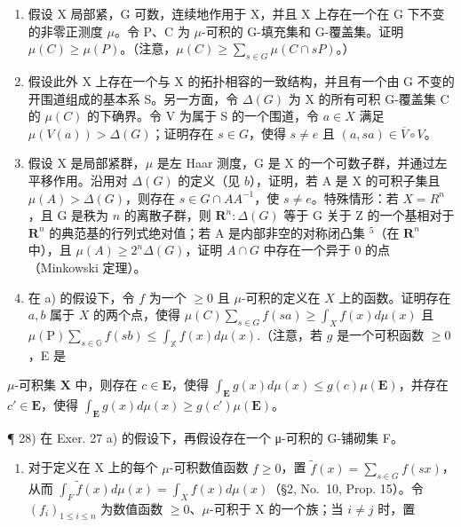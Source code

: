 \begin{enumerate}
\def\labelenumi{\alph{enumi})}
\item
  假设 X 局部紧，G 可数，连续地作用于 X，并且 X 上存在一个在 G 下不变的非零正测度 \(\mu\)。令 P、C 为 \(\mu\)-可积的 G-填充集和 G-覆盖集。证明 \(\mu(C) \geqslant \mu(P)\)。（注意，\(\mu(C) \geqslant \sum_{s \in G} \mu(C \cap sP)\)。）
\item
  假设此外 X 上存在一个与 X 的拓扑相容的一致结构，并且有一个由 G 不变的开围道组成的基本系 S。另一方面，令 \(\Delta(G)\) 为 X 的所有可积 G-覆盖集 C 的 \(\mu(C)\) 的下确界。令 V 为属于 S 的一个围道，令 \(a \in X\) 满足 \(\mu(V(a)) > \Delta(G)\)；证明存在 \(s \in G\)，使得 \(s \neq e\) 且 \((a, sa) \in \overline{V} \circ V\)。
\item
  假设 X 是局部紧群，\(\mu\) 是左 Haar 测度，G 是 X 的一个可数子群，并通过左平移作用。沿用对 \(\Delta(G)\) 的定义（见 \(b\)），证明，若 A 是 X 的可积子集且 \(\mu(A) > \Delta(G)\)，则存在 \(s \in G \cap AA^{-1}\)，使 \(s \neq e\)。特殊情形：若 \(X = R^n\)，且 G 是秩为 \(n\) 的离散子群，则 \(\mathbf{R}^n: \Delta(G)\) 等于 G 关于 Z 的一个基相对于 \(\mathbf{R}^n\) 的典范基的行列式绝对值；若 A 是内部非空的对称闭凸集 \(^5\)（在 \(\mathbf{R}^n\) 中），且 \(\mu(A) \geqslant 2^n \Delta(G)\)，证明 \(A \cap G\) 中存在一个异于 0 的点（Minkowski 定理）。
\item
在 a) 的假设下，令 \(f\) 为一个 \(\geqslant 0\) 且 \(\mu\)-可积的定义在 \(X\) 上的函数。证明存在 \(a, b\) 属于 \(X\) 的两个点，使得 \(\mu(C) \sum_{s \in G} f(sa) \geqslant \int_X f(x) d\mu(x)\) 且 \(\mu (\mathrm{P})\sum_{s\in \mathbb{G}}f(sb)\leqslant \int_{\mathbb{X}}f(x)d\mu (x).\)（注意，若 \(g\) 是一个可积函数 \(\geqslant 0\)，E 是
\end{enumerate}

\(\mu\)-可积集 \(\mathbf{X}\) 中，则存在 \(c \in \mathbf{E}\)，使得 \(\int_{\mathbf{E}} g(x) d\mu(x) \leqslant g(c)\mu(\mathbf{E})\)，并存在 \(c' \in \mathbf{E}\)，使得 \(\int_{\mathbf{E}} g(x) d\mu(x) \geqslant g(c')\mu(\mathbf{E})\)。

¶ 28) 在 Exer. 27 a) 的假设下，再假设存在一个 μ-可积的 G-铺砌集 F。

\begin{enumerate}
\def\labelenumi{\alph{enumi})}
\tightlist
\item
对于定义在 X 上的每个 \(\mu\)-可积数值函数 \(f \geqslant 0\)，置 \(\widetilde{f}(x) = \sum_{s \in G} f(sx)\)，从而 \(\int_{F} \widetilde{f}(x) d\mu(x) = \int_{X} f(x) d\mu(x)\)（§2, No.~10, Prop. 15）。令 \((f_i)_{1 \leqslant i \leqslant n}\) 为数值函数 \(\geqslant 0\)、\(\mu\)-可积于 X 的一个族；当 \(i \neq j\) 时，置
\end{enumerate}

